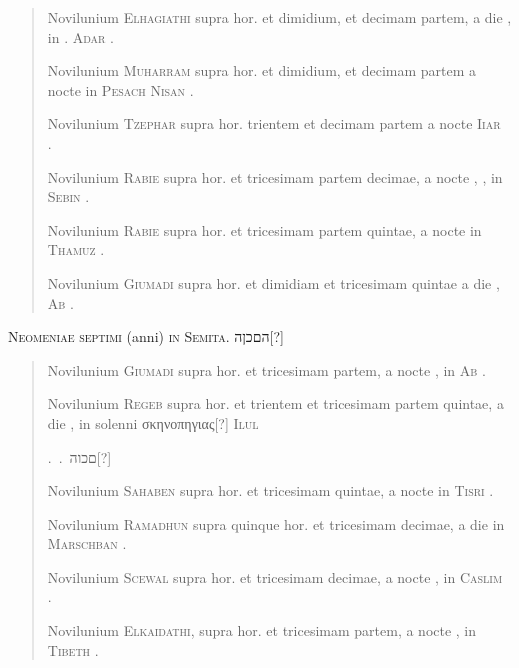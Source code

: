 \begin{quotation}
Novilunium \textsc{Elhagiathi} supra  hor. et dimidium,
 et decimam 
partem, a die ,  in . \textsc{Adar} 
\hfill {}.~

Novilunium \textsc{Muharram} supra  hor. et dimidium,
 et decimam 
partem a nocte  in \textsc{Pesach}  \textsc{Nisan} 
\hfill {}.~

Novilunium \textsc{Tzephar} supra  hor. trientem et decimam 
partem a nocte  \textsc{Iiar} 
\hfill {}.~

Novilunium \textsc{Rabie} supra  hor. et tricesimam partem
 decimae, 
a nocte , , in  \textsc{Sebin} 
\hfill {}.~

Novilunium \textsc{Rabie} supra  hor. et tricesimam partem
 quintae, 
a nocte  in  \textsc{Thamuz} 
\hfill {}.~

Novilunium \textsc{Giumadi} supra  hor. et dimidiam
 et tricesimam 
quintae a die ,  \textsc{Ab} 
\hfill {}.~
\end{quotation}

%
\begin{center}
\large\textsc{Neomeniae septimi} (anni) \textsc{in Semita.}
 \texthebrew{הםכןה}[?]\\
\end{center}

\begin{quotation}
Novilunium \textsc{Giumadi} supra  hor. et tricesimam partem,
a nocte , in  \textsc{Ab}
\hfill {}.~

Novilunium \textsc{Regeb} supra  hor. et trientem
 et tricesimam
partem quintae, a die ,  in solenni
\textgreek{σκηνοπηγιας[?]}  \textsc{Ilul}
\par
\hfill {}.~.~\texthebrew{םכוה}[?]

Novilunium \textsc{Sahaben} supra  hor. et tricesimam quintae,
a nocte in  \textsc{Tisri}
\hfill {}.~

Novilunium \textsc{Ramadhun} supra quinque hor. et tricesimam
 de\-ci\-mae,
a die  in  \textsc{Marschban}
\hfill {}.~

Novilunium \textsc{Scewal} supra  hor. et tricesimam decimae,
a nocte , in  \textsc{Caslim}
\hfill {}.~

Novilunium \textsc{Elkaidathi}, supra  hor. et tricesimam
partem, a nocte , in  \textsc{Tibeth}
\hfill {}.~

\end{quotation}

